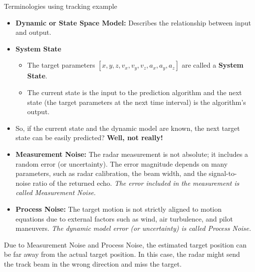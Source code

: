 \begin{frame}{Terminologies using tracking example}
    
    
    \begin{itemize}
    
        \item \textbf{Dynamic or State Space Model:} Describes the relationship between input and output. 
        \item \textbf{System State}
    
            \begin{itemize}
                \item The target parameters $[x, y, z, v_x, v_y, v_z, a_x, a_y, a_z]$ are called a \textbf{System State}. 
                
                \item The current state is the input to the prediction algorithm and the next state (the target parameters at the next time interval) is the algorithm's output.
            \end{itemize}
    
        \item So, if the current state and the dynamic model are known, the next target state can be easily predicted? \textbf{Well, not really!}
        
        \item \textbf{Measurement Noise:} The radar measurement is not absolute; it includes a random error (or uncertainty). The error magnitude depends on many parameters, such as radar calibration, the beam width, and the signal-to-noise ratio of the returned echo. \textit{The error included in the measurement is called Measurement Noise.}
        
        
        \item \textbf{Process Noise:} The target motion is not strictly aligned to motion equations due to external factors such as wind, air turbulence, and pilot maneuvers. \textit{The dynamic model error (or uncertainty) is called Process Noise.}
    \end{itemize}
    
    \begin{framed}
    Due to Measurement Noise and Process Noise, the estimated target position can be far away from the actual target position. In this case, the radar might send the track beam in the wrong direction and miss the target.
    \end{framed}
    
\end{frame}



